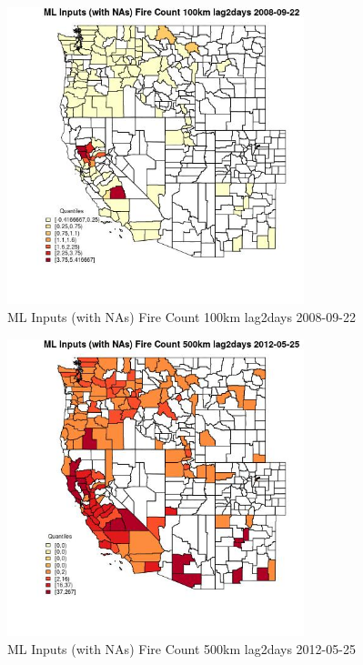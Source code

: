 \begin{figure} 
\centering  
\includegraphics[width=0.77\textwidth]{Code_Outputs/Report_ML_input_PM25_Step4_part_e_de_duplicated_aves_compiled_2019-05-18wNAs_CountyFire_Count_100km_lag2daysMean2008-09-22_2008-09-22.jpg} 
\caption{\label{fig:Report_ML_input_PM25_Step4_part_e_de_duplicated_aves_compiled_2019-05-18wNAsCountyFire_Count_100km_lag2daysMean2008-09-22_2008-09-22}ML Inputs (with NAs) Fire Count 100km lag2days 2008-09-22} 
\end{figure} 
 

\begin{figure} 
\centering  
\includegraphics[width=0.77\textwidth]{Code_Outputs/Report_ML_input_PM25_Step4_part_e_de_duplicated_aves_compiled_2019-05-18wNAs_CountyFire_Count_500km_lag2daysMean2012-05-25_2012-05-25.jpg} 
\caption{\label{fig:Report_ML_input_PM25_Step4_part_e_de_duplicated_aves_compiled_2019-05-18wNAsCountyFire_Count_500km_lag2daysMean2012-05-25_2012-05-25}ML Inputs (with NAs) Fire Count 500km lag2days 2012-05-25} 
\end{figure} 
 

